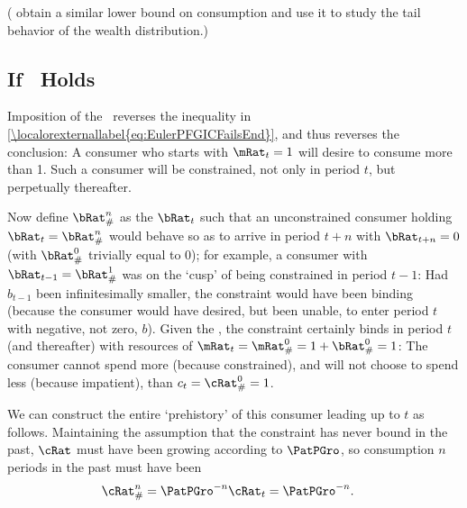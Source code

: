 \documentclass[\econtexRoot/BufferStockTheory.tex]{subfiles}
\begin{document}
(\cite{StachurskiToda2019JET} obtain a similar lower bound on consumption and use it to study the tail behavior of the wealth distribution.)


\subsection{If \PFGIC~Holds}

Imposition of the \PFGIC~reverses the inequality in
\eqref{\localorexternallabel{eq:EulerPFGICFailsEnd}}, and thus
reverses the conclusion: A consumer who starts with $\mRat_{t}=1$ will
desire to consume more than 1.  Such a consumer will be constrained,
not only in period $t$, but perpetually thereafter.

Now define $\bRat_{\#}^{n}$ as the $\bRat_{t}$ such that
an unconstrained consumer holding $\bRat_{t}=\bRat_{\#}^{n}$ would behave so as to arrive in period $t+n$ with $\bRat_{t+n}=0$ (with $\bRat_{\#}^{0}$ trivially equal to 0); for example, a consumer with $\bRat_{t-1}=\bRat_{\#}^{1}$ was on the `cusp' of being constrained in period
$t-1$: Had $b_{t-1}$ been infinitesimally smaller, the constraint
would have been binding (because the consumer would have desired, but
been unable, to enter period $t$ with negative, not zero, $b$).  Given
the \PFGIC, the constraint certainly binds in period $t$ (and
thereafter) with resources of
$\mRat_{t}=\mRat_{\#}^{0}=1+\bRat_{\#}^{0}=1$: The consumer cannot
spend more (because constrained), and will not choose to spend less
(because impatient), than $c_{t}=\cRat_{\#}^{0}=1$.

We can construct the entire `prehistory' of this consumer leading up to $t$ as follows.
Maintaining the assumption that the constraint has never bound in the past,
$\cRat$ must have been growing according to $\PatPGro$, so consumption $n$ periods in the past must have been
\begin{align}
  \cRat_{\#}^{n}  & = \PatPGro^{-n} \cRat_{t} = \PatPGro^{-n}. \label{eq:cPreHist}
\end{align}
\end{document}
